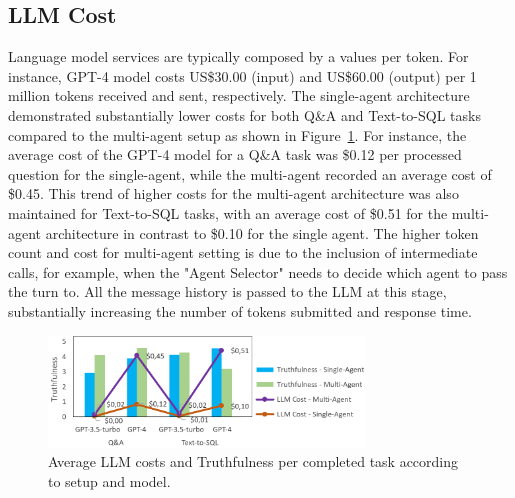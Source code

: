         
            
        
        \subsection{LLM Cost} 
            Language model services are typically composed by a values per token. For instance, GPT-4 model costs US\$30.00 (input) and US\$60.00 (output) per 1 million tokens received and sent, respectively.        
            The single-agent architecture demonstrated substantially lower costs for both Q\&A and Text-to-SQL tasks compared to the multi-agent setup as shown in Figure~\ref{fig:truthfulness_vs_cost_vs_config_model}. For instance, the average cost of the GPT-4 model \citep{OpenAI2023} for a Q\&A task was \$0.12 per processed question for the single-agent, while the multi-agent recorded an average cost of \$0.45. This trend of higher costs for the multi-agent architecture was also maintained for Text-to-SQL tasks, with an average cost of \$0.51 for the multi-agent architecture in contrast to \$0.10 for the single agent.
            The higher token count and cost for multi-agent setting is due to the inclusion of intermediate calls, for example, when the "Agent Selector" needs to decide which agent to pass the turn to. All the message history is passed to the LLM at this stage, substantially increasing the number of tokens submitted and response time.
        

            \begin{figure}[h]
                \centering              
                    \includegraphics[width=0.75\textwidth]{images/truthfulness_vs_cost_vs_config_model.png}
                \caption{Average LLM costs and Truthfulness per completed task according to setup and model.}
                \label{fig:truthfulness_vs_cost_vs_config_model}
            \end{figure}
            
